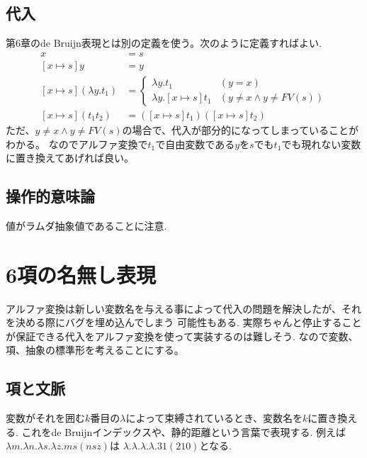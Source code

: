 \documentclass[a4paper,10pt]{article}
\begin{document}
\subsection*{代入}
第6章のde Bruijn表現とは別の定義を使う。次のように定義すればよい.
\begin{align*}
    [x \mapsto s] x  &= s \\
    [x \mapsto s] y  &= y \\
    [x \mapsto s] (\lambda y. t_1)    &= 
    \begin{cases}
        \lambda y. t_1 & (y=x)\\
        \lambda y. [x \mapsto s]t_1 & (y \neq x \land y \neq FV(s))
    \end{cases}\\
    [x \mapsto s](t_1 t_2) &= ([x \mapsto s]t_1) ([x \mapsto s]t_2)
\end{align*}
ただ、$y \neq x \land y \neq FV(s)$の場合で、代入が部分的になってしまっていることがわかる。
なのでアルファ変換で$t_1$で自由変数である$y$を$s$でも$t_1$でも現れない変数に置き換えてあげれば良い。
\subsection*{操作的意味論}
値がラムダ抽象値であることに注意.

\section*{6項の名無し表現}
アルファ変換は新しい変数名を与える事によって代入の問題を解決したが、それを決める際にバグを埋め込んでしまう
可能性もある. 実際ちゃんと停止することが保証できる代入をアルファ変換を使って実装するのは難しそう. 
なので変数、項、抽象の標準形を考えることにする。
\subsection*{項と文脈}
変数がそれを囲む$k$番目の$\lambda$によって束縛されているとき、変数名を$k$に置き換える.
これをde Bruijnインデックスや、静的距離という言葉で表現する.
例えば$\lambda m. \lambda n. \lambda s. \lambda z. m s (n s z)$は
$\lambda. \lambda. \lambda. \lambda. 3 1 (2 1 0)$となる.
\end{document}
